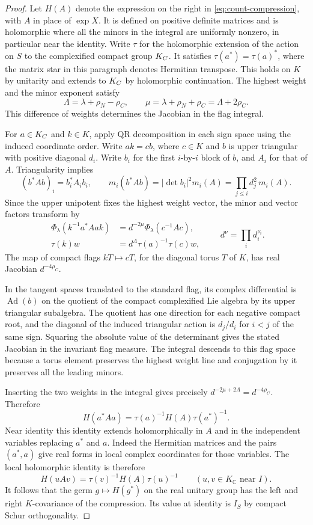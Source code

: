 \begin{proof}
Let \(H(A)\) denote the expression on the right in
\eqref{eq:count-compression}, with \(A\) in place of \(\exp X\).
It is defined on positive definite matrices and is holomorphic
where all the minors in the integral are uniformly nonzero,
in particular near the identity. Write \(\tau\) for the
holomorphic extension of the action on \(S\) to the complexified
compact group \(K_{C}\). It satisfies \(\tau(a^*)=\tau(a)^*\),
where the matrix star in this paragraph denotes Hermitian transpose.
This holds on \(K\) by unitarity and extends to \(K_{C}\) by
holomorphic continuation. The highest weight and the minor exponent satisfy
\[
 \Lambda=\lambda+\rho_N-\rho_C,\qquad
 \mu=\lambda+\rho_N+\rho_C=\Lambda+2\rho_C .
\]
This difference of weights determines the Jacobian in the flag integral.

For \(a\in K_{C}\) and \(k\in K\), apply QR decomposition in each
sign space using the induced coordinate order. Write \(ak=cb\),
where \(c\in K\) and \(b\) is upper triangular with positive diagonal
\(d_i\). Write \(b_i\) for the first \(i\)-by-\(i\) block of \(b\), and
\(A_i\) for that of \(A\). Triangularity implies
\[
 (b^*Ab)_i=b_i^* A_i b_i,\qquad
 m_i(b^*Ab)=|\det b_i|^2m_i(A)=\prod_{j\le i}d_j^2\,m_i(A).
\] Since the upper unipotent fixes the highest weight vector, the
minor and vector factors transform by
\[
 \begin{aligned}
 \Phi_\lambda(k^{-1}a^*Aa k)&=d^{-2\mu}\Phi_\lambda(c^{-1}Ac),\\
 \tau(k)w&=d^\Lambda\tau(a)^{-1}\tau(c)w,
 \end{aligned}
 \qquad d^\nu=\prod_i d_i^{\nu_i}.
\] The map of compact flags \(kT\mapsto cT\), for the diagonal
torus \(T\) of \(K\), has real Jacobian \(d^{-4\rho_C}\).

In the tangent spaces translated to the standard flag, its complex
differential is \(\operatorname{Ad}(b)\) on the quotient of the
compact complexified Lie algebra by its upper triangular subalgebra.
The quotient has one direction for each negative compact root, and
the diagonal of the induced triangular action is \(d_j/d_i\) for
\(i<j\) of the same sign. Squaring the absolute value of the
determinant gives the stated Jacobian in the invariant flag measure.
The integral descends to this flag space because a torus element
preserves the highest weight line and conjugation by it preserves
all the leading minors.

Inserting the two weights in the integral
gives precisely \(d^{-2\mu+2\Lambda}=d^{-4\rho_C}\). Therefore
\[
       H(a^* A a)=\tau(a)^{-1}H(A)\tau(a^*)^{-1} .
\]
Near identity this identity extends holomorphically in \(A\) and in
the independent variables replacing \(a^*\) and \(a\). Indeed the
Hermitian matrices and the pairs \((a^*,a)\) give real forms in
local complex coordinates for those variables. The local holomorphic identity is therefore
\[
 H(uAv)=\tau(v)^{-1}H(A)\tau(u)^{-1}
       \qquad(u,v\in K_{\mathbb C}\text{ near }I).
\]
It follows that the germ \(g\mapsto H(g^*)\) on the real unitary
group has the left and right \(K\)-covariance of the compression.
Its value at identity is \(I_S\) by compact Schur orthogonality.


\end{proof}
